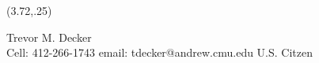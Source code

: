 \documentclass[]{article}
\begin{document}
%
%
%
\begin{textblock}{9}(3.72,.25)
\begin{center}
{\fontsize{40}{40}\selectfont Trevor M. Decker}\\
{\fontsize{9}{9}\selectfont
Cell: 412-266-1743  \hspace*{.5cm} email: tdecker@andrew.cmu.edu  \hspace*{.5cm} U.S. Citzen\\
}
\end{center}
\end{textblock}


\addtolength{\topmargin}{1in}
\pagestyle{empty} %
\end{document}
